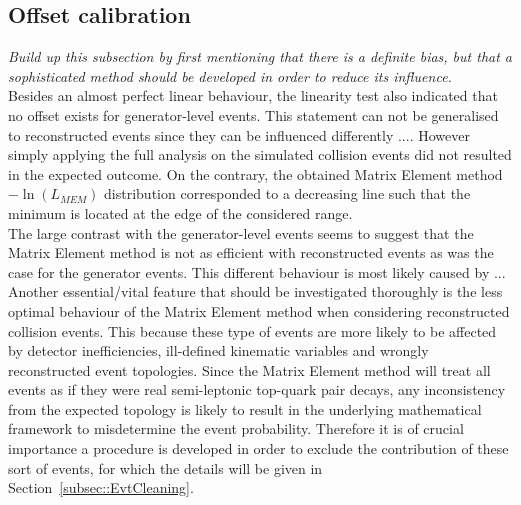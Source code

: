 \subsection{Offset calibration}
\textit{Build up this subsection by first mentioning that there is a definite bias, but that a sophisticated method should be developed in order to reduce its influence.}
\\

Besides an almost perfect linear behaviour, the linearity test also indicated that no offset exists for generator-level events. This statement can not be generalised to reconstructed events since they can be influenced differently .... However simply applying the full analysis on the simulated collision events did not resulted in the expected outcome. On the contrary, the obtained Matrix Element method $-\ln(L_{MEM})$ distribution corresponded to a decreasing line such that the minimum is located at the edge of the considered range.
\\

The large contrast with the generator-level events seems to suggest that the Matrix Element method is not as efficient with reconstructed events as was the case for the generator events. This different behaviour is most likely caused by ...
\\


Another essential/vital feature that should be investigated thoroughly is the less optimal behaviour of the Matrix Element method when considering reconstructed collision events.
This because these type of events are more likely to be affected by detector inefficiencies, ill-defined kinematic variables and wrongly reconstructed event topologies.
Since the Matrix Element method will treat all events as if they were real semi-leptonic top-quark pair decays, any inconsistency from the expected topology is likely to result in the underlying mathematical framework to misdetermine the event probability.
Therefore it is of crucial importance a procedure is developed in order to exclude the contribution of these sort of events, for which the details will be given in Section~\ref{subsec::EvtCleaning}.

